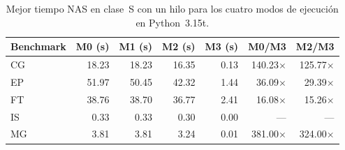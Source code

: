 \begin{table}[htbp]
\centering
\small
\begin{tabular}{lrrrrrr}
\hline
Benchmark & M0 (s) & M1 (s) & M2 (s) & M3 (s) & M0/M3 & M2/M3 \\
\hline
CG & 18.23 & 18.23 & 16.35 & 0.13 & 140.23$\times$ & 125.77$\times$ \\
EP & 51.97 & 50.45 & 42.32 & 1.44 & 36.09$\times$ & 29.39$\times$ \\
FT & 38.76 & 38.70 & 36.77 & 2.41 & 16.08$\times$ & 15.26$\times$ \\
IS & 0.33 & 0.33 & 0.30 & 0.00 & --- & --- \\
MG & 3.81 & 3.81 & 3.24 & 0.01 & 381.00$\times$ & 324.00$\times$ \\
\hline
\end{tabular}
\caption{Mejor tiempo NAS en clase~S con un hilo para los cuatro modos de ejecución en Python~3.15t.}
\label{tab:resultados-s-t1-modos}
\end{table}
